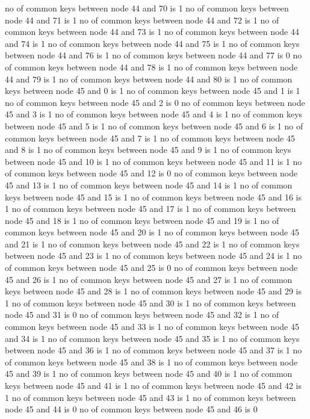 no of common keys between node 44 and 70 is 1
no of common keys between node 44 and 71 is 1
no of common keys between node 44 and 72 is 1
no of common keys between node 44 and 73 is 1
no of common keys between node 44 and 74 is 1
no of common keys between node 44 and 75 is 1
no of common keys between node 44 and 76 is 1
no of common keys between node 44 and 77 is 0
no of common keys between node 44 and 78 is 1
no of common keys between node 44 and 79 is 1
no of common keys between node 44 and 80 is 1
no of common keys between node 45 and 0 is 1
no of common keys between node 45 and 1 is 1
no of common keys between node 45 and 2 is 0
no of common keys between node 45 and 3 is 1
no of common keys between node 45 and 4 is 1
no of common keys between node 45 and 5 is 1
no of common keys between node 45 and 6 is 1
no of common keys between node 45 and 7 is 1
no of common keys between node 45 and 8 is 1
no of common keys between node 45 and 9 is 1
no of common keys between node 45 and 10 is 1
no of common keys between node 45 and 11 is 1
no of common keys between node 45 and 12 is 0
no of common keys between node 45 and 13 is 1
no of common keys between node 45 and 14 is 1
no of common keys between node 45 and 15 is 1
no of common keys between node 45 and 16 is 1
no of common keys between node 45 and 17 is 1
no of common keys between node 45 and 18 is 1
no of common keys between node 45 and 19 is 1
no of common keys between node 45 and 20 is 1
no of common keys between node 45 and 21 is 1
no of common keys between node 45 and 22 is 1
no of common keys between node 45 and 23 is 1
no of common keys between node 45 and 24 is 1
no of common keys between node 45 and 25 is 0
no of common keys between node 45 and 26 is 1
no of common keys between node 45 and 27 is 1
no of common keys between node 45 and 28 is 1
no of common keys between node 45 and 29 is 1
no of common keys between node 45 and 30 is 1
no of common keys between node 45 and 31 is 0
no of common keys between node 45 and 32 is 1
no of common keys between node 45 and 33 is 1
no of common keys between node 45 and 34 is 1
no of common keys between node 45 and 35 is 1
no of common keys between node 45 and 36 is 1
no of common keys between node 45 and 37 is 1
no of common keys between node 45 and 38 is 1
no of common keys between node 45 and 39 is 1
no of common keys between node 45 and 40 is 1
no of common keys between node 45 and 41 is 1
no of common keys between node 45 and 42 is 1
no of common keys between node 45 and 43 is 1
no of common keys between node 45 and 44 is 0
no of common keys between node 45 and 46 is 0
